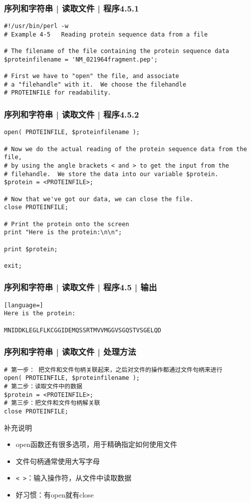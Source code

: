 \begin{frame}[fragile]
  \frametitle{序列和字符串 | 读取文件 | 程序4.5.1}
\begin{lstlisting}
#!/usr/bin/perl -w
# Example 4-5   Reading protein sequence data from a file

# The filename of the file containing the protein sequence data
$proteinfilename = 'NM_021964fragment.pep';

# First we have to "open" the file, and associate
# a "filehandle" with it.  We choose the filehandle
# PROTEINFILE for readability.
\end{lstlisting}  
\end{frame}

\begin{frame}[fragile]
  \frametitle{序列和字符串 | 读取文件 | 程序4.5.2}
\begin{lstlisting}[firstnumber=10,basicstyle=\footnotesize\tt]
open( PROTEINFILE, $proteinfilename );

# Now we do the actual reading of the protein sequence data from the file,
# by using the angle brackets < and > to get the input from the
# filehandle.  We store the data into our variable $protein.
$protein = <PROTEINFILE>;

# Now that we've got our data, we can close the file.
close PROTEINFILE;

# Print the protein onto the screen
print "Here is the protein:\n\n";

print $protein;

exit;
\end{lstlisting}  
\end{frame}

\begin{frame}[fragile]
  \frametitle{序列和字符串 | 读取文件 | 程序4.5 | 输出}
\begin{lstlisting}[language=]
Here is the protein:

MNIDDKLEGLFLKCGGIDEMQSSRTMVVMGGVSGQSTVSGELQD
\end{lstlisting}
\end{frame}

\begin{frame}[fragile]
  \frametitle{序列和字符串 | 读取文件 | \alert{处理方法}}
\begin{lstlisting}
# 第一步： 把文件和文件句柄关联起来，之后对文件的操作都通过文件句柄来进行
open( PROTEINFILE, $proteinfilename );
# 第二步：读取文件中的数据
$protein = <PROTEINFILE>;
# 第三步：把文件和文件句柄解关联
close PROTEINFILE;
\end{lstlisting}
\pause
\begin{block}{补充说明}
  \begin{itemize}
    \item open函数还有很多选项，用于精确指定如何使用文件
    \item 文件句柄通常使用大写字母
    \item \verb|< >|：输入操作符，从文件中读取数据
    \item 好习惯：有open就有close
  \end{itemize}
\end{block}
\end{frame}

